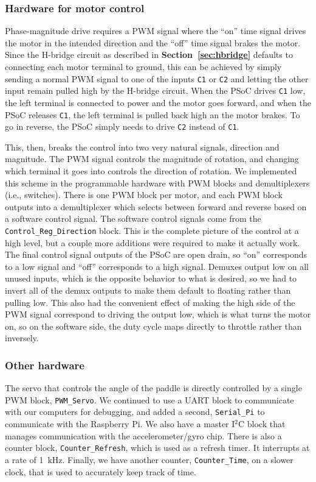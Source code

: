 \documentclass[letterpaper, 11pt]{article}
\newcommand*{\secref}[1]{\textbf{Section~\ref{#1}}}
\newcommand{\iic}{I$^2$C\xspace}
\begin{document}
\begin{enumerate}[label=\textbf{\arabic*.}]
\subsubsection{Hardware for motor control}
\label{sec:prog-hard-motor}
Phase-magnitude drive requires a PWM signal where the ``on'' time signal drives the motor in the intended direction and the ``off'' time signal brakes the motor. Since the H-bridge circuit as described in \secref{sec:hbridge} defaults to connecting each motor terminal to ground, this can be achieved by simply sending a normal PWM signal to one of the inputs \texttt{C1} or \texttt{C2} and letting the other input remain pulled high by the H-bridge circuit. When the PSoC drives \texttt{C1} low, the left terminal is connected to power and the motor goes forward, and when the PSoC releases \texttt{C1}, the left terminal is pulled back high an the motor brakes. To go in reverse, the PSoC simply needs to drive \texttt{C2} instead of \texttt{C1}.

This, then, breaks the control into two very natural signals, direction and magnitude. The PWM signal controls the magnitude of rotation, and changing which terminal it goes into controls the direction of rotation. We implemented this scheme in the programmable hardware with PWM blocks and demultiplexers (i.e., switches). There is one PWM block per motor, and each PWM block outputs into a demultiplexer which selects between forward and reverse based on a software control signal. The software control signals come from the \verb|Control_Reg_Direction| block. This is the complete picture of the control at a high level, but a couple more additions were required to make it actually work. The final control signal outputs of the PSoC are open drain, so ``on'' corresponds to a low signal and ``off'' corresponds to a high signal. Demuxes output low on all unused inputs, which is the opposite behavior to what is desired, so we had to invert all of the demux outputs to make them default to floating rather than pulling low. This also had the convenient effect of making the high side of the PWM signal correspond to driving the output low, which is what turns the motor on, so on the software side, the duty cycle maps directly to throttle rather than inversely.

\subsubsection{Other hardware}
The servo that controls the angle of the paddle is directly controlled by a single PWM block, \verb|PWM_Servo|. We continued to use a UART block to communicate with our computers for debugging, and added a second, \verb|Serial_Pi| to communicate with the Raspberry Pi. We also have a master \iic block that manages communication with the accelerometer/gyro chip. There is also a counter block, \verb|Counter_Refresh|, which is used as a refresh timer. It interrupts at a rate of \SI{1}{\kilo\hertz}. Finally, we have another counter, \verb|Counter_Time|, on a slower clock, that is used to accurately keep track of time.


\end{enumerate}
\end{document}
